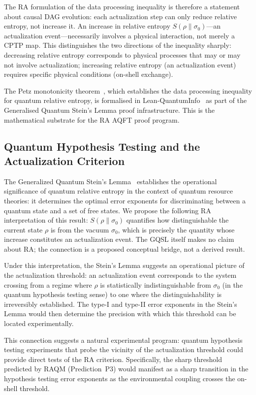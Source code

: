 \documentclass[11pt,a4paper]{article}
\theoremstyle{plain}
\theoremstyle{definition}
\theoremstyle{remark}
\begin{document}
The RA formulation of the data processing inequality is therefore a statement about
causal DAG evolution: each actualization step can only reduce relative entropy, not
increase it. An increase in relative entropy $S(\rho \| \sigma_0)$---an
actualization event---necessarily involves a physical interaction, not merely a
CPTP map. This distinguishes the two directions of the inequality sharply:
decreasing relative entropy corresponds to physical processes that may or may not
involve actualization; increasing relative entropy (an actualization event) requires
specific physical conditions (on-shell exchange).

The Petz monotonicity theorem~\citep{Petz1986}, which establishes the data
processing inequality for quantum relative entropy, is formalised in
Lean-QuantumInfo~\citep{Meiburg2025LQI} as part of the Generalised Quantum
Stein's Lemma proof infrastructure. This is the mathematical substrate for the
RA AQFT proof program.

\subsection{Quantum Hypothesis Testing and the Actualization Criterion}

The Generalized Quantum Stein's Lemma~\citep{Meiburg2025LQI} establishes the
operational significance of quantum relative entropy in the context of quantum
resource theories: it determines the optimal error exponents for discriminating
between a quantum state and a set of free states. We propose the following RA
interpretation of this result: $S(\rho \| \sigma_0)$ quantifies how distinguishable
the current state $\rho$ is from the vacuum $\sigma_0$, which is precisely the
quantity whose increase constitutes an actualization event. The GQSL itself makes
no claim about RA; the connection is a proposed conceptual bridge, not a derived
result.

Under this interpretation, the Stein's Lemma suggests an operational picture of
the actualization threshold: an actualization event corresponds to the system
crossing from a regime where $\rho$ is statistically indistinguishable from
$\sigma_0$ (in the quantum hypothesis testing sense) to one where the
distinguishability is irreversibly established. The type-I and type-II error
exponents in the Stein's Lemma would then determine the precision with which
this threshold can be located experimentally.

This connection suggests a natural experimental program: quantum hypothesis testing
experiments that probe the vicinity of the actualization threshold could provide
direct tests of the RA criterion. Specifically, the sharp threshold predicted by
RAQM (Prediction~P3) would manifest as a sharp transition in the hypothesis
testing error exponents as the environmental coupling crosses the on-shell
threshold.
\end{document}
